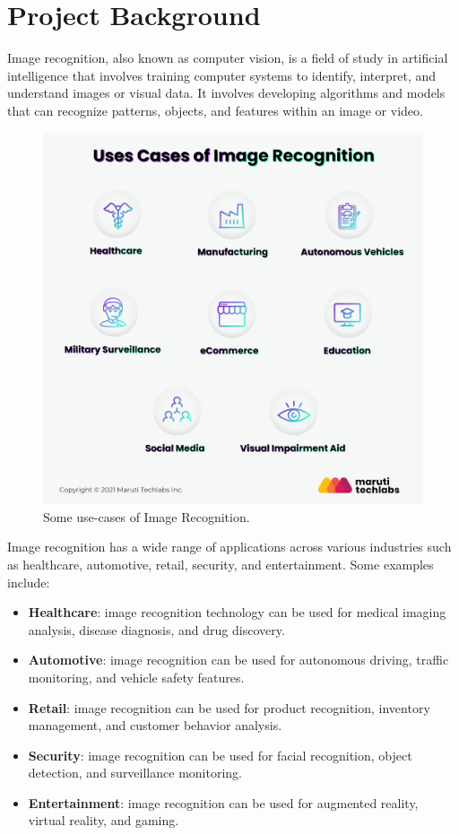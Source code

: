 \documentclass[../main.tex]{subfiles}
\begin{document}
\part*{Project Background}
Image recognition, also known as computer vision, is a field of study in artificial intelligence that involves training computer systems to identify, interpret, and understand images or visual data. It involves developing algorithms and models that can recognize patterns, objects, and features within an image or video.

\begin{figure}[h!]
\centering
\includegraphics[scale=0.3]{images/image_rec_uses.png}
\caption{Some use-cases of Image Recognition.\citet{im}}
\label{fig:im_uses}
\end{figure}

Image recognition has a wide range of applications across various industries such as healthcare, automotive, retail, security, and entertainment. Some examples include:
\begin{itemize}
    \item \textbf{Healthcare}: image recognition technology can be used for medical imaging analysis, disease diagnosis, and drug discovery.
    \item \textbf{Automotive}: image recognition can be used for autonomous driving, traffic monitoring, and vehicle safety features.
    \item \textbf{Retail}: image recognition can be used for product recognition, inventory management, and customer behavior analysis.
    \item \textbf{Security}: image recognition can be used for facial recognition, object detection, and surveillance monitoring.
    \item \textbf{Entertainment}: image recognition can be used for augmented reality, virtual reality, and gaming.
\end{itemize}
\end{document}
